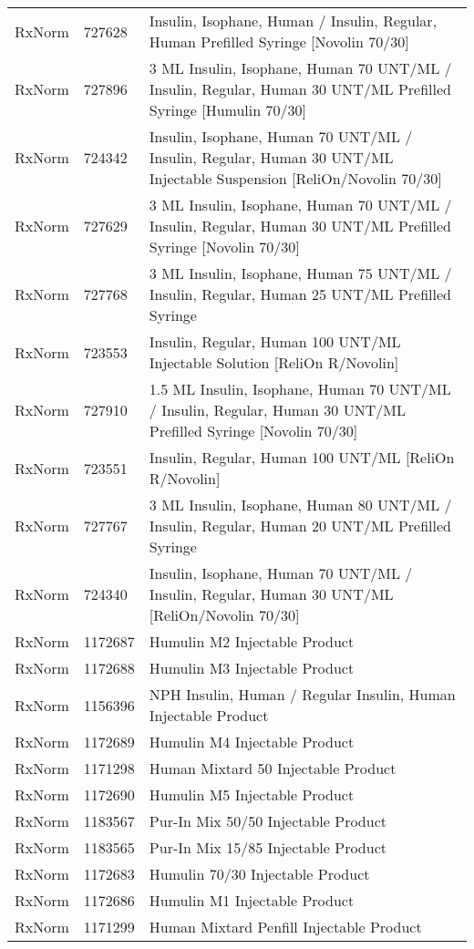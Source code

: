 \begin{longtable}{p{}p{}p{}}
  RxNorm & 727628 & Insulin, Isophane, Human / Insulin, Regular, Human Prefilled Syringe [Novolin 70/30] \\ 
  RxNorm & 727896 & 3 ML Insulin, Isophane, Human 70 UNT/ML / Insulin, Regular, Human 30 UNT/ML Prefilled Syringe [Humulin 70/30] \\ 
  RxNorm & 724342 & Insulin, Isophane, Human 70 UNT/ML / Insulin, Regular, Human 30 UNT/ML Injectable Suspension [ReliOn/Novolin 70/30] \\ 
  RxNorm & 727629 & 3 ML Insulin, Isophane, Human 70 UNT/ML / Insulin, Regular, Human 30 UNT/ML Prefilled Syringe [Novolin 70/30] \\ 
  RxNorm & 727768 & 3 ML Insulin, Isophane, Human 75 UNT/ML / Insulin, Regular, Human 25 UNT/ML Prefilled Syringe \\ 
  RxNorm & 723553 & Insulin, Regular, Human 100 UNT/ML Injectable Solution [ReliOn R/Novolin] \\ 
  RxNorm & 727910 & 1.5 ML Insulin, Isophane, Human 70 UNT/ML / Insulin, Regular, Human 30 UNT/ML Prefilled Syringe [Novolin 70/30] \\ 
  RxNorm & 723551 & Insulin, Regular, Human 100 UNT/ML [ReliOn R/Novolin] \\ 
  RxNorm & 727767 & 3 ML Insulin, Isophane, Human 80 UNT/ML / Insulin, Regular, Human 20 UNT/ML Prefilled Syringe \\ 
  RxNorm & 724340 & Insulin, Isophane, Human 70 UNT/ML / Insulin, Regular, Human 30 UNT/ML [ReliOn/Novolin 70/30] \\ 
  RxNorm & 1172687 & Humulin M2 Injectable Product \\ 
  RxNorm & 1172688 & Humulin M3 Injectable Product \\ 
  RxNorm & 1156396 & NPH Insulin, Human / Regular Insulin, Human Injectable Product \\ 
  RxNorm & 1172689 & Humulin M4 Injectable Product \\ 
  RxNorm & 1171298 & Human Mixtard 50 Injectable Product \\ 
  RxNorm & 1172690 & Humulin M5 Injectable Product \\ 
  RxNorm & 1183567 & Pur-In Mix 50/50 Injectable Product \\ 
  RxNorm & 1183565 & Pur-In Mix 15/85 Injectable Product \\ 
  RxNorm & 1172683 & Humulin 70/30 Injectable Product \\ 
  RxNorm & 1172686 & Humulin M1 Injectable Product \\ 
  RxNorm & 1171299 & Human Mixtard Penfill Injectable Product \\ 

\end{longtable}
